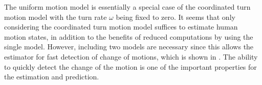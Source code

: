 \documentclass[letterpaper, 10 pt, conference]{ieeeconf}
\begin{document}
	The uniform motion model is essentially a special case of the coordinated turn motion model with the turn rate $\omega$ being fixed to zero.
	It seems that only considering the coordinated turn motion model suffices to estimate human motion states, in addition to the benefits of reduced computations by using the single model.
	However, including two models are necessary since this allows the estimator for fast detection of change of motions, which is shown in \cite{caveney2004multiple}.
	The ability to quickly detect the change of the motion is one of the important properties for the estimation and prediction.          	
	
	
\end{document}
